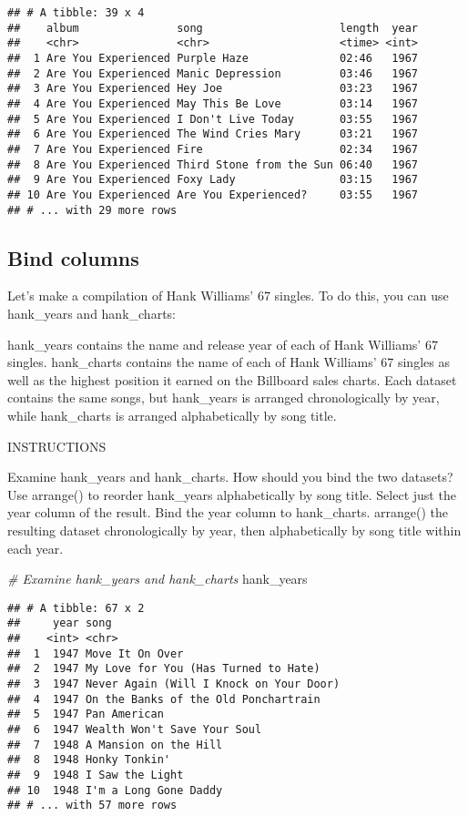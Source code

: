\documentclass[]{article}
\newenvironment{Shaded}{\begin{snugshade}}{\end{snugshade}}
\newcommand{\CommentTok}[1]{\textcolor[rgb]{0.56,0.35,0.01}{\textit{#1}}}
\newcommand{\NormalTok}[1]{#1}
\begin{document}
\begin{verbatim}
## # A tibble: 39 x 4
##    album               song                     length  year
##    <chr>               <chr>                    <time> <int>
##  1 Are You Experienced Purple Haze              02:46   1967
##  2 Are You Experienced Manic Depression         03:46   1967
##  3 Are You Experienced Hey Joe                  03:23   1967
##  4 Are You Experienced May This Be Love         03:14   1967
##  5 Are You Experienced I Don't Live Today       03:55   1967
##  6 Are You Experienced The Wind Cries Mary      03:21   1967
##  7 Are You Experienced Fire                     02:34   1967
##  8 Are You Experienced Third Stone from the Sun 06:40   1967
##  9 Are You Experienced Foxy Lady                03:15   1967
## 10 Are You Experienced Are You Experienced?     03:55   1967
## # ... with 29 more rows
\end{verbatim}

\subsection{Bind columns}\label{bind-columns}

Let's make a compilation of Hank Williams' 67 singles. To do this, you
can use hank\_years and hank\_charts:

hank\_years contains the name and release year of each of Hank Williams'
67 singles. hank\_charts contains the name of each of Hank Williams' 67
singles as well as the highest position it earned on the Billboard sales
charts. Each dataset contains the same songs, but hank\_years is
arranged chronologically by year, while hank\_charts is arranged
alphabetically by song title.

INSTRUCTIONS

Examine hank\_years and hank\_charts. How should you bind the two
datasets? Use arrange() to reorder hank\_years alphabetically by song
title. Select just the year column of the result. Bind the year column
to hank\_charts. arrange() the resulting dataset chronologically by
year, then alphabetically by song title within each year.

\begin{Shaded}
\begin{Highlighting}[]
\CommentTok{# Examine hank_years and hank_charts}
\NormalTok{hank_years}
\end{Highlighting}
\end{Shaded}

\begin{verbatim}
## # A tibble: 67 x 2
##     year song                                   
##    <int> <chr>                                  
##  1  1947 Move It On Over                        
##  2  1947 My Love for You (Has Turned to Hate)   
##  3  1947 Never Again (Will I Knock on Your Door)
##  4  1947 On the Banks of the Old Ponchartrain   
##  5  1947 Pan American                           
##  6  1947 Wealth Won't Save Your Soul            
##  7  1948 A Mansion on the Hill                  
##  8  1948 Honky Tonkin'                          
##  9  1948 I Saw the Light                        
## 10  1948 I'm a Long Gone Daddy                  
## # ... with 57 more rows
\end{verbatim}
\end{document}
